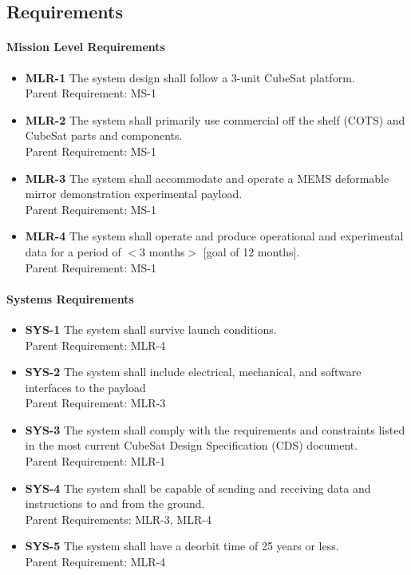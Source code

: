 \documentclass[12pt]{article}
\begin{document}
		\subsection{Requirements}
		 
		\paragraph{Mission Level Requirements}
		\begin{itemize}
				\item \textbf{MLR-1} The system design shall follow a 3-unit CubeSat platform.\\
				Parent Requirement: MS-1
				\item \textbf{MLR-2} The system shall primarily use commercial off the shelf (COTS) and CubeSat parts and components.\\
				Parent Requirement: MS-1
				\item \textbf{MLR-3} The system shall accommodate and operate a MEMS deformable mirror demonstration experimental payload.\\
				Parent Requirement: MS-1
				\item \textbf{MLR-4} The system shall operate and produce operational and experimental data for a period of $<$3 months$>$ [goal of 12 months].\\
				Parent Requirement: MS-1
		\end{itemize}
		
		\paragraph{Systems Requirements}
		
		\begin{itemize}
			\item \textbf{SYS-1} The system shall survive launch conditions.\\
			Parent Requirement: MLR-4
			\item \textbf{SYS-2} The system shall include electrical, mechanical, and software interfaces to the payload\\
			Parent Requirement: MLR-3
			\item \textbf{SYS-3} The system shall comply with the requirements and constraints listed in the most current CubeSat Design Specification (CDS) document. \cite{mission_cubesat} \\
			Parent Requirement: MLR-1
			\item \textbf{SYS-4} The system shall be capable of sending and receiving data and instructions to and from the ground.\\
			Parent Requirements: MLR-3, MLR-4
			\item \textbf{SYS-5} The system shall have a deorbit time of 25 years or less. \cite{mission_deorbit}\\
			Parent Requirement: MLR-4
		\end{itemize}
\end{document}
